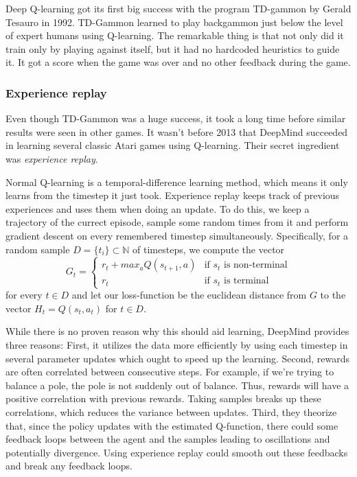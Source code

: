 \documentclass{article}
\theoremstyle{changedot}
\theoremstyle{changedotbreak}
\theoremstyle{nonumberplain}
\begin{document}
Deep Q-learning got its first big success with the program TD-gammon by Gerald Tesauro in 1992. TD-Gammon learned to play backgammon just below the level of expert humans using Q-learning. The remarkable thing is that not only did it train only by playing against itself, but it had no hardcoded heuristics to guide it. It got a score when the game was over and no other feedback during the game.

\subsubsection{Experience replay}
Even though TD-Gammon was a huge success, it took a long time before similar results were seen in other games. It wasn't before 2013 that DeepMind succeeded in learning several classic Atari games using Q-learning. Their secret ingredient was \emph{experience replay}.

Normal Q-learning is a temporal-difference learning method, which means it only learns from the timestep it just took. Experience replay keeps track of previous experiences and uses them when doing an update. To do this, we keep a trajectory of the currect episode, sample some random times from it and perform gradient descent on every remembered timestep simultaneously. Specifically, for a random sample $D = \{t_{i}\} \subset \mathbb N$ of timesteps, we compute the vector
\[G_{t} =  \begin{cases}
    r_{t} + max_{a} Q(s_{t+1}, a) & \text{if $s_{t}$ is non-terminal} \\
    r_{t} & \text{if $s_{t}$ is terminal}
  \end{cases} \]
for every $t \in D$ and let our loss-function be the euclidean distance from $G$ to the vector $H_{t} = Q(s_{t}, a_{t})$ for $t \in D$.

While there is no proven reason why this should aid learning, DeepMind provides three reasons: First, it utilizes the data more efficiently by using each timestep in several parameter updates which ought to speed up the learning. Second, rewards are often correlated between consecutive steps. For example, if we're trying to balance a pole, the pole is not suddenly out of balance. Thus, rewards will have a positive correlation with previous rewards. Taking samples breaks up these correlations, which reduces the variance between updates. Third, they theorize that, since the policy updates with the estimated Q-function, there could some feedback loops between the agent and the samples leading to oscillations and potentially divergence. Using experience replay could smooth out these feedbacks and break any feedback loops.
\end{document}
